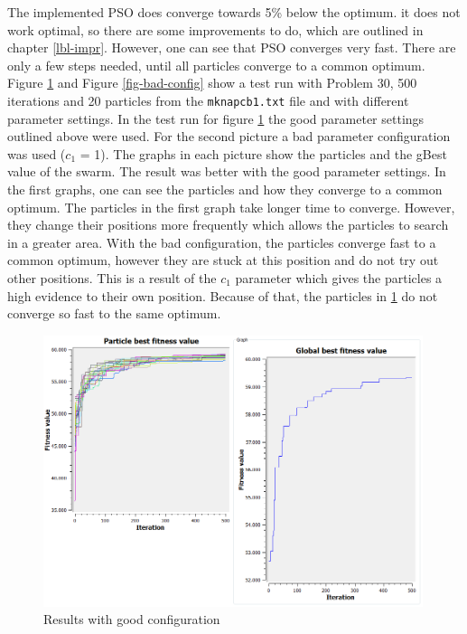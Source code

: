\documentclass{article}
\begin{document}
The implemented PSO does converge towards 5\% below the optimum. it does not work optimal, so there are some improvements to do, which are outlined in chapter \ref{lbl-impr}. However, one can see that PSO converges very fast. There are only a few steps needed, until all particles converge to a common optimum. Figure \ref{fig-good-config} and Figure \ref{fig-bad-config} show a test run with Problem 30, 500 iterations and 20 particles from the \lstinline{mknapcb1.txt} file and with different parameter settings. In the test run for figure \ref{fig-good-config} the good parameter settings outlined above were used. For the second picture a bad parameter configuration was used ($c_1$ = 1). The graphs in each picture show the particles and the gBest value of the swarm. The result was better with the good parameter settings. In the first graphs, one can see the particles and how they converge to a common optimum. The particles in the first graph take longer time to converge. However, they change their positions more frequently which allows the particles to search in a greater area. With the bad configuration, the particles converge fast to a common optimum, however they are stuck at this position and do not try out other positions. This is a result of the $c_1$ parameter which gives the particles a high evidence to their own position. Because of that, the particles in \ref{fig-good-config} do not converge so fast to the same optimum.

\begin{figure}[H]
    \centering
    \includegraphics[width=420px]{images/p20_500it_p30_both.png}
    \caption{Results with good configuration}
    \label{fig-good-config}
\end{figure}
\end{document}
